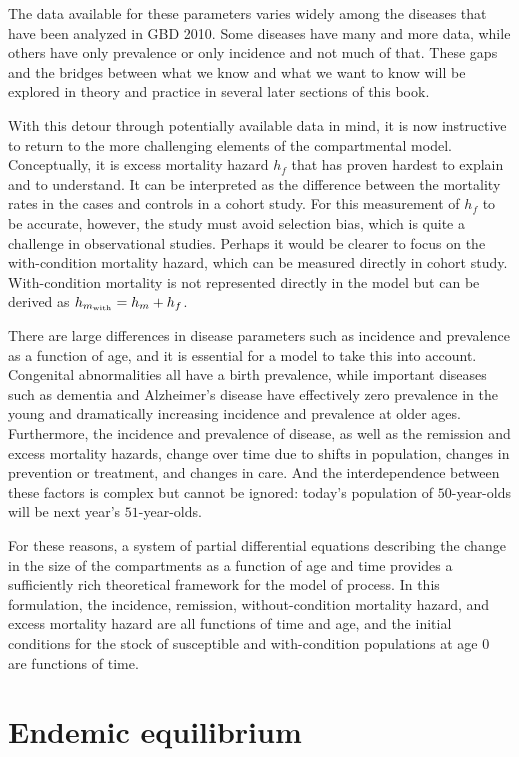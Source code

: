 The data available for these parameters varies widely among the
diseases that have been analyzed in GBD 2010. Some diseases
have many and more data, while others have only prevalence or only
incidence and not much of that. These gaps and the bridges between
what we know and what we want to know will be explored in theory and
practice in several later sections of this book.

With this detour through potentially available data in mind, it is now
instructive to return to the more challenging elements of the
compartmental model. Conceptually, it is excess mortality hazard $h_f$
that has proven hardest to explain and to understand. It can be
interpreted as the difference between the mortality rates in the cases
and controls in a cohort study.  For this measurement of $h_f$ to be
accurate, however, the study must avoid selection bias, which is quite
a challenge in observational studies.  Perhaps it would be clearer to
focus on the with-condition mortality hazard, which can be measured
directly in cohort study. With-condition mortality is not represented
directly in the model but can be derived as $h_{m_{\text{with}}} = h_m+h_f$.

There are large differences in disease parameters such as incidence
and prevalence as a function of age, and it is essential for a model
to take this into account.  Congenital abnormalities all have a birth
prevalence, while important diseases such as dementia and Alzheimer's
disease have effectively zero prevalence in the young and
dramatically increasing incidence and prevalence at older
ages. Furthermore, the incidence and prevalence of disease, as well as
the remission and excess mortality hazards, change over time due to
shifts in population, changes in prevention or treatment, and changes
in care. And the interdependence between these factors is complex but
cannot be ignored: today's population of $50$-year-olds will be next year's
$51$-year-olds.

For these reasons, a system of partial differential equations
describing the change in the size of the compartments as a function of
age and time provides a sufficiently rich theoretical framework for
the model of process.  In this formulation, the incidence, remission,
without-condition mortality hazard, and excess mortality hazard are all
functions of time and age, and the initial conditions for the stock of
susceptible and with-condition populations at age $0$ are functions of
time.

\section{Endemic equilibrium}
\label{theory-forward_sim-compartmental_model-simplying_assumptions}


